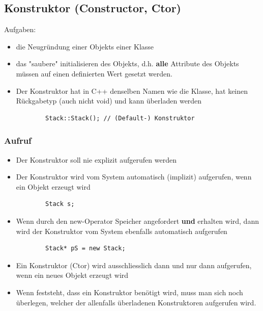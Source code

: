 \subsection{Konstruktor (Constructor, Ctor)}
\label{sec:Konstruktor}
Aufgaben:
\begin{itemize}
	\item die Neugründung einer Objekts einer Klasse
	\item das "saubere" initialisieren des Objekts, d.h. \textbf{alle} Attribute des Objekts müssen auf einen definierten Wert gesetzt werden.
	\item Der Konstruktor hat in C++ denselben Namen wie die Klasse, hat keinen Rückgabetyp (auch nicht void) und kann überladen werden\\
	\begin{minipage}{\linewidth}
		\begin{lstlisting}
		Stack::Stack();	// (Default-) Konstruktor
		\end{lstlisting}
	\end{minipage}
\end{itemize}

\subsubsection{Aufruf}
\label{sec:Aufruf}
\begin{itemize}
	\item Der Konstruktor soll nie explizit aufgerufen werden
	\item Der Konstruktor wird vom System automatisch (implizit) aufgerufen, wenn ein Objekt erzeugt wird\\
	\begin{minipage}{\linewidth}
		\begin{lstlisting}
		Stack s;
		\end{lstlisting}
	\end{minipage}
	\item Wenn durch den new-Operator Speicher angefordert \textbf{und} erhalten wird, dann wird der Konstruktor vom System ebenfalls automatisch aufgerufen\\
	\begin{minipage}{\linewidth}
		\begin{lstlisting}
		Stack* pS = new Stack;
		\end{lstlisting}
	\end{minipage}
\end{itemize}

\label{sec:Welcher Konstruktor wird wann aufgerufen?}
\begin{itemize}
	\item Ein Konstruktor (Ctor) wird ausschliesslich dann und nur dann aufgerufen, wenn ein neues Objekt erzeugt wird
	\item Wenn feststeht, dass ein Konstruktor benötigt wird, muss man sich noch überlegen, welcher der allenfalls überladenen Konstruktoren aufgerufen wird.
\end{itemize}

